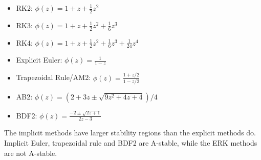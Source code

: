 \documentclass[10pt]{report}
\begin{document}
\begin{enumerate}
\begin{itemize}
		\item 
		RK2: $\phi(z) = 1 + z + \frac{1}{2}z^2$
		\item 
		RK3: $\phi(z) = 1 + z + \frac{1}{2}z^2 + \frac{1}{6}z^3$
		\item 
		RK4: $\phi(z) = 1 + z + \frac{1}{2}z^2 + \frac{1}{6}z^3 + \frac{1}{24}z^4$
		\item 
		Explicit Euler: $\phi(z) = \frac{1}{1-z}$
		\item 
		Trapezoidal Rule/AM2: $\phi(z) = \frac{1+z/2}{1-z/2}$
		\item 
		AB2: $\phi(z) = (2+3z\pm\sqrt{9z^2+4z+4})/4$
		\item 
		BDF2: $\phi(z) = \frac{-2\pm\sqrt{2z+1}}{2z-3}$
	\end{itemize}
	The implicit methods have larger stability regions than the explicit methods do. Implicit Euler, trapezoidal rule and BDF2 are  A-stable, while the ERK methods are not A-stable.
\end{enumerate}
\end{document}
